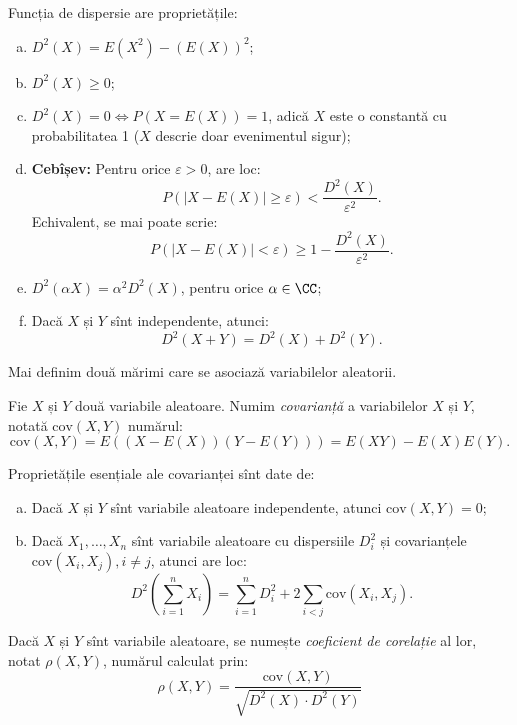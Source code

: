 Funcția de dispersie are proprietățile:
\begin{enumerate}[(a)]
\item $ D^2(X) = E(X^2) - (E(X))^2 $;
\item $ D^2(X) \geq 0 $;
\item $ D^2(X) = 0 \Leftrightarrow P(X = E(X)) = 1 $, adică $ X $ este o constantă cu
  probabilitatea 1 ($ X $ descrie doar evenimentul sigur);
\item \textbf{Cebîșev:} Pentru orice $ \varepsilon > 0 $, are loc:
  \[
    P(|X - E(X)| \geq \varepsilon) < \frac{D^2(X)}{\varepsilon^2}. 
  \]
  Echivalent, se mai poate scrie:
  \[
    P(|X - E(X)| < \varepsilon) \geq 1 - \frac{D^2(X)}{\varepsilon^2}.
  \]
\item $ D^2(\alpha X) = \alpha^2 D^2(X) $, pentru orice $ \alpha \in \CC $;
\item Dacă $ X $ și $ Y $ sînt independente, atunci:
  \[
    D^2(X + Y) = D^2(X) + D^2(Y).
  \]
\end{enumerate}

Mai definim două mărimi care se asociază variabilelor aleatorii.

\begin{definition}\label{def:cov}
  Fie $ X $ și $ Y $ două variabile aleatoare. Numim \emph{covarianță} a
  variabilelor $ X $ și $ Y $, notată $ \mathrm{cov}(X, Y) $ numărul:
  \[
    \mathrm{cov}(X, Y) = E((X - E(X))(Y - E(Y))) = E(XY) - E(X)E(Y).
  \]
\end{definition}

Proprietățile esențiale ale covarianței sînt date de:
\begin{enumerate}[(a)]
\item Dacă $ X $ și $ Y $ sînt variabile aleatoare independente, atunci
  $ \mathrm{cov}(X, Y) = 0 $;
\item Dacă $ X_1, \dots, X_n $ sînt variabile aleatoare cu dispersiile
  $ D_i^2 $ și covarianțele $ \mathrm{cov}(X_i, X_j), i \neq j $, atunci are loc:
  \[
    D^2\left( \sum_{i = 1}^n X_i \right) = \sum_{i = 1}^n D_i^2 + %
    2 \sum_{i < j} \mathrm{cov}(X_i, X_j).
  \]
\end{enumerate}

\begin{definition}\label{def:cor}
  Dacă $ X $ și $ Y $ sînt variabile aleatoare, se numește \emph{coeficient de corelație}
  al lor, notat $ \rho(X, Y) $, numărul calculat prin:
  \[
    \rho(X, Y) = \frac{\mathrm{cov}(X, Y)}{\sqrt{D^2(X) \cdot D^2(Y)}}
  \]
\end{definition}

